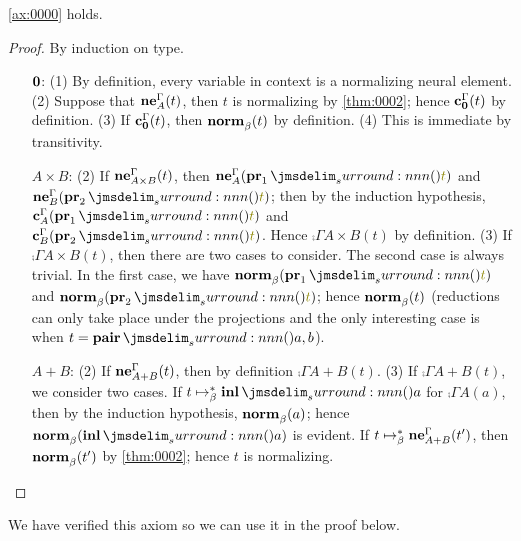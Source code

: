 \documentclass[a4paper]{article}
\begin{document}
\begin{lemma}
  \cref{ax:0000} holds.
\end{lemma}
\begin{proof}
  By induction on type.
  \begin{itemize}
  \item[$\mathbf{0}$:] (1) By definition, every variable in context is a normalizing neural element.
    (2) Suppose that $\operatorname{\mathbf{ne}}^{\Gamma}_{A}(t)$, then $t$ is normalizing by \cref{thm:0002}; hence $\operatorname{\mathbf{c}}^{\Gamma}_{\mathbf{0}}(t)$ by definition.
    (3) If $\operatorname{\mathbf{c}}^{\Gamma}_{\mathbf{0}}(t)$, then $\operatorname{\mathbf{norm}}^{}_{\beta}(t)$ by definition.
    (4) This is immediate by transitivity.
  \item[$A \times B$:] (2) If $\operatorname{\mathbf{ne}}^{\Gamma}_{A \times B}(t)$, then $\neu{\Gamma}{A}(\tmPrl{t})$ and $\neu{\Gamma}{B}(\tmPrr{t})$; then by the induction hypothesis, $\comp{\Gamma}{A}(\tmPrl{t})$ and $\comp{\Gamma}{B}(\tmPrr{t})$.
    Hence $\comp{\Gamma}{A \times B}(t)$ by definition.
    (3) If $\comp{\Gamma}{A \times B}(t)$, then there are two cases to consider.
    The second case is always trivial.
    In the first case, we have $\norm(\tmPrl{t})$ and $\norm(\tmPrr{t})$; hence $\operatorname{\mathbf{norm}}^{}_{\beta}(t)$ (reductions can only take place under the projections and the only interesting case is when $t = \tmPair{a}{b}$).
  \item[$A + B$:] (2) If $\operatorname{\mathbf{ne}}^{\Gamma}_{A + B}(t)$, then by definition $\comp{\Gamma}{A + B}(t)$.
    (3) If $\comp{\Gamma}{A + B}(t)$, we consider two cases.
    If $t \bRed* \tmInl{a}$ for $\comp{\Gamma}{A}(a)$, then by the induction hypothesis, $\operatorname{\mathbf{norm}}^{}_{\beta}(a)$; hence $\norm(\tmInl{a})$ is evident.
    If $t \bRed* \neu{\Gamma}{A + B}(t')$, then $\operatorname{\mathbf{norm}}^{}_{\beta}(t')$ by \cref{thm:0002}; hence $t$ is normalizing.
  \end{itemize}
\end{proof}

We have verified this axiom so we can use it in the proof below.
\end{document}
